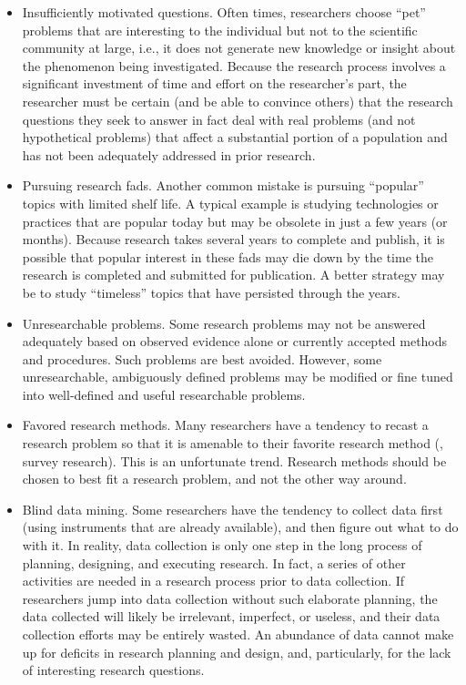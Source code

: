 \begin{itemize}
	\item Insufficiently motivated questions. Often times, researchers choose ``pet'' problems that are interesting to the individual but not to the scientific community at large, i.e., it does not generate new knowledge or insight about the phenomenon being investigated. Because the research process involves a significant investment of time and effort on the researcher's part, the researcher must be certain (and be able to convince others) that the research questions they seek to answer in fact deal with real problems (and not hypothetical problems) that affect a substantial portion of a population and has not been adequately addressed in prior research.

	\item Pursuing research fads. Another common mistake is pursuing ``popular'' topics with limited shelf life. A typical example is studying technologies or practices that are popular today but may be obsolete in just a few years (or months). Because research takes several years to complete and publish, it is possible that popular interest in these fads may die down by the time the research is completed and submitted for publication. A better strategy may be to study ``timeless'' topics that have persisted through the years.

	\item Unresearchable problems. Some research problems may not be answered adequately based on observed evidence alone or currently accepted methods and procedures. Such problems are best avoided. However, some unresearchable, ambiguously defined problems may be modified or fine tuned into well-defined and useful researchable problems.

	\item Favored research methods. Many researchers have a tendency to recast a research problem so that it is amenable to their favorite research method (\eg, survey research). This is an unfortunate trend. Research methods should be chosen to best fit a research problem, and not the other way around.

	\item Blind data mining. Some researchers have the tendency to collect data first (using instruments that are already available), and then figure out what to do with it. In reality, data collection is only one step in the long process of planning, designing, and executing research. In fact, a series of other activities are needed in a research process prior to data collection. If researchers jump into data collection without such elaborate planning, the data collected will likely be irrelevant, imperfect, or useless, and their data collection efforts may be entirely wasted. An abundance of data cannot make up for deficits in research planning and design, and, particularly, for the lack of interesting research questions.


\end{itemize}
